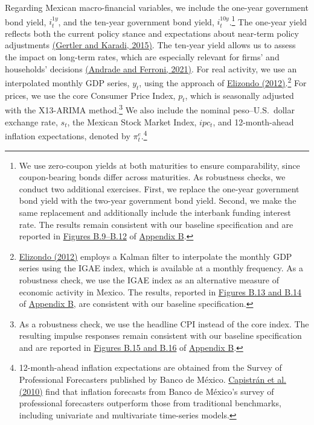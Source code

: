 \documentclass[12pt, reqno]{article}
\begin{document}
Regarding Mexican macro-financial variables, we include the one-year government bond yield, $i_t^{1y}$, and the ten-year government bond yield, $i_t^{10y}$.\footnote{We use zero-coupon yields at both maturities to ensure comparability, since coupon-bearing bonds differ across maturities. As robustness checks, we conduct two additional exercises. First, we replace the one-year government bond yield with the two-year government bond yield. Second, we make the same replacement and additionally include the interbank funding interest rate. The results remain consistent with our baseline specification and are reported in \hyperlink{Figure B.9}{Figures B.9--B.12} of \hyperlink{Appendix B}{Appendix B}.} The one-year yield reflects both the current policy stance and expectations about near-term policy adjustments \hyperlink{Gertler and Karadi (2015)}{(Gertler and Karadi, 2015)}. The ten-year yield allows us to assess the impact on long-term rates, which are especially relevant for firms’ and households’ decisions \hyperlink{Andrade and Ferroni (2021)}{(Andrade and Ferroni, 2021)}. For real activity, we use an interpolated monthly GDP series, $y_t$, using the approach of \hyperlink{Elizondo (2012)}{Elizondo (2012)}.\footnote{\hyperlink{Elizondo (2012)}{Elizondo (2012)} employs a Kalman filter to interpolate the monthly GDP series using the IGAE index, which is available at a monthly frequency. As a robustness check, we use the IGAE index as an alternative measure of economic activity in Mexico. The results, reported in \hyperlink{Figure B.13}{Figures B.13 and B.14} of \hyperlink{Appendix B}{Appendix B}, are consistent with our baseline specification.} For prices, we use the core Consumer Price Index, $p_t$, which is seasonally adjusted with the X13-ARIMA method.\footnote{As a robustness check, we use the headline CPI instead of the core index. The resulting impulse responses remain consistent with our baseline specification and are reported in \hyperlink{Figure B.15}{Figures B.15 and B.16} of \hyperlink{Appendix B}{Appendix B}.} We also include the nominal peso--U.S.\ dollar exchange rate, $s_t$, the Mexican Stock Market Index, $ipc_t$, and 12-month-ahead inflation expectations, denoted by $\pi^{e}_{t}$.\footnote{12-month-ahead inflation expectations are obtained from the Survey of Professional Forecasters published by Banco de México. \hyperlink{Capistran et al. (2010)}{Capistrán et al. (2010)} find that inflation forecasts from Banco de México’s survey of professional forecasters outperform those from traditional benchmarks, including univariate and multivariate time-series models.}
\end{document}

